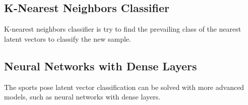 \blindtext

\subsection{K-Nearest Neighbors Classifier}

K-nearest neighbors classifier is try to find the prevailing class of the nearest latent vectors to classify the new sample.
\blindtext

\blindtext

\subsection{Neural Networks with Dense Layers}

The sports pose latent vector classification can be solved with more advanced models, such as neural networks with dense layers.
\blindtext

\blindtext